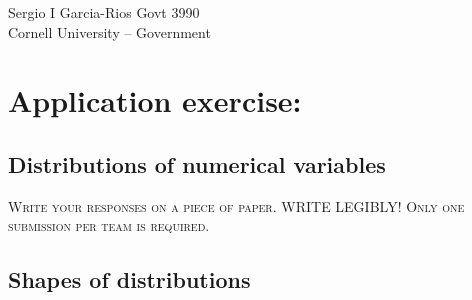 \documentclass[12pt]{article}
\begin{document}

Sergio I Garcia-Rios \hfill Govt 3990 \\
Cornell University -- Government \hfill \\

\section*{Application exercise:} 
\subsection*{Distributions of numerical variables}

\textsc{Write your responses on a piece of paper. WRITE LEGIBLY! Only one submission per team is required.}

\subsection*{Shapes of distributions}
\end{document}
